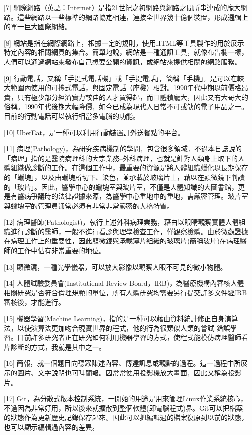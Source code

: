 \documentclass[a5paper, 11pt
]{book}
\begin{document}
{[}7{]}
網際網路（英語：Internet）是指21世紀之初網路與網路之間所串連成的龐大網路。這些網路以一些標準的網路協定相連，連接全世界幾十億個裝置，形成邏輯上的單一巨大國際網絡。

{[}8{]}
網站是指在網際網路上，根據一定的規則，使用HTML等工具製作的用於展示特定內容的相關網頁的集合。簡單地說，網站是一種通訊工具，就像布告欄一樣，人們可以通過網站來發布自己想要公開的資訊，或網站來提供相關的網路服務。

{[}9{]}
行動電話，又稱「手提式電話機」或「手提電話」，簡稱「手機」，是可以在較大範圍內使用的可攜式電話，與固定電話（座機）相對。1990年代中期以前價格昂貴，只有極少部分經濟實力較佳的人才買得起，而且體積龐大，因此又有大哥大的俗稱。1990年代後期大幅降價，如今已成為現代人日常不可或缺的電子用品之一。目前的行動電話可以執行相當多電腦的功能。

{[}10{]} UberEat，是一種可以利用行動裝置訂外送餐點的平台。

{[}11{]}
病理(Pathology)，為研究疾病機制的學問，包含很多領域，不過本日誌說的「病理」指的是醫院病理科的大宗業務--外科病理，也就是針對人類身上取下的人體組織做診斷的工作。在這個工作中，最重要的資源是將人體組織蠟化以長期保存的「蠟塊」，以及由蠟塊所切下、染色，並承載於玻璃片上，藉以在顯微鏡下判讀的「玻片」。因此，醫學中心的蠟塊室與玻片室，不僅是人體知識的大圖書館，更是有醫病爭議時的法律證據來源，為醫學中心重地中的重地，需嚴密管理。玻片室與蠟塊室的管理員通常必須有非常非常嚴密的人格特質。

{[}12{]}
病理醫師(Pathologist)，執行上述外科病理業務，藉由以眼睛觀察實體人體組織進行診斷的醫師，一般不進行看診與理學檢查工作，僅觀察檢體。由於微觀證據在病理工作上的重要性，因此顯微鏡與承載薄片組織的玻璃片(簡稱玻片)在病理醫師的工作中佔有非常重要的地位。

{[}13{]} 顯微鏡，一種光學儀器，可以放大影像以觀察人眼不可見的微小物體。

{[}14{]} 人體試驗委員會(Institutional Review
Board，IRB)，為醫療機構內審核人體相關研究是否符合倫理規範的單位，所有人體研究均需要另行提交許多文件經IRB審核後，才能進行。

{[}15{]} 機器學習(Machine
Learning)，指的是一種可以藉由資料統計修正自身演算法，以使演算法更加吻合現實世界的程式，他的行為很類似人類的嘗試-錯誤學習。目前許多研究者正在研究如何利用機器學習的方式，使程式能模仿病理醫師看片診斷的方式，我就是其中之一。

{[}16{]}
簡報，就一個題目向聽眾陳述內容、傳達訊息或觀點的過程。這一過程中所展示的圖片、文字說明也可叫簡報。因常常使用投影機放大畫面，因此又稱為投影片。

{[}17{]}
Git，為分散式版本控制系統，一開始的用途是用來管理Linux作業系統核心，不過因為非常好用，所以後來就擴散到整個軟體(即電腦程式)界。Git可以把檔案的狀態作為更新歷史記錄保存起來。因此可以把編輯過的檔案復原到以前的狀態，也可以顯示編輯過內容的差異。
\end{document}
